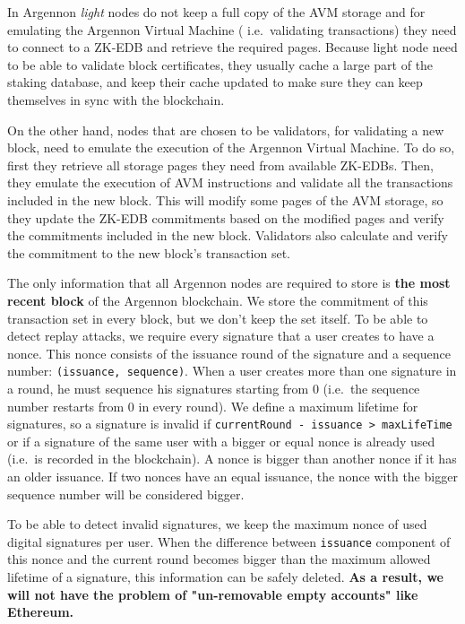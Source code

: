 In Argennon \emph{light} nodes do not keep a full copy of the AVM storage and for emulating the Argennon Virtual Machine
( i.e.~validating transactions) they need to connect to a ZK-EDB and retrieve the required pages.
Because light node need to be able to validate block certificates, they usually cache a large part of the staking
database, and keep their cache updated to make sure they can keep themselves in sync with the blockchain.


On the other hand, nodes that are chosen to be validators, for validating a new block, need to emulate the
execution of the Argennon Virtual Machine. To do so, first they retrieve all storage pages they
need from available ZK-EDBs. Then, they emulate the execution of AVM instructions and validate all the
transactions included in the new block. This will modify some pages of the AVM storage, so they update the ZK-EDB
commitments based on the modified pages and verify the commitments included in the new block. Validators also
calculate and verify the commitment to the new block's transaction set.



The only information that all Argennon nodes are required to store is \textbf{the most recent block} of the Argennon
blockchain.
We store the commitment of this
transaction set in every block, but we don't keep the set itself. To be able to detect replay attacks, we require
every signature that a user creates to have a nonce. This nonce consists of the issuance round of the signature
and a sequence number: \texttt{(issuance,\ sequence)}. When a user creates more than one signature in a round, he
must sequence his signatures starting from 0 (i.e.~the sequence number restarts from 0 in every round). We define
a maximum lifetime for signatures, so a signature is invalid if \texttt{currentRound - issuance > maxLifeTime} or
if a signature of the same user with a bigger or equal nonce is already used
(i.e.~is recorded in the blockchain). A nonce is bigger than another nonce if it has an older issuance. If two
nonces have an equal issuance, the nonce with the bigger sequence number will be considered bigger.

To be able to detect invalid signatures, we keep the maximum nonce of used digital signatures per user. When the
difference between \texttt{issuance} component of this nonce and the current round becomes bigger than the
maximum allowed lifetime of a signature, this information can be safely deleted. \textbf{As a result, we will not
have the problem of "un-removable empty accounts" like Ethereum.}



